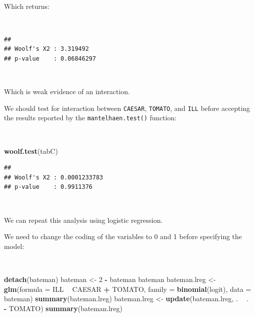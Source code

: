 \documentclass[12pt,a4paper]{book}
\newenvironment{Shaded}{\begin{snugshade}}{\end{snugshade}}
\newcommand{\DataTypeTok}[1]{\textcolor[rgb]{0.13,0.29,0.53}{#1}}
\newcommand{\DecValTok}[1]{\textcolor[rgb]{0.00,0.00,0.81}{#1}}
\newcommand{\KeywordTok}[1]{\textcolor[rgb]{0.13,0.29,0.53}{\textbf{#1}}}
\newcommand{\NormalTok}[1]{#1}
\newcommand{\OperatorTok}[1]{\textcolor[rgb]{0.81,0.36,0.00}{\textbf{#1}}}
\newcommand{\StringTok}[1]{\textcolor[rgb]{0.31,0.60,0.02}{#1}}
\theoremstyle{definition}
\theoremstyle{definition}
\theoremstyle{definition}
\theoremstyle{remark}
\begin{document}
~

Which returns:

~

\begin{verbatim}
## 
## Woolf's X2 : 3.319492 
## p-value    : 0.06846297
\end{verbatim}

~

Which is weak evidence of an interaction.

We should test for interaction between \texttt{CAESAR}, \texttt{TOMATO},
and \texttt{ILL} before accepting the results reported by the
\texttt{mantelhaen.test()} function:

~

\begin{Shaded}
\begin{Highlighting}[]
\KeywordTok{woolf.test}\NormalTok{(tabC)}
\end{Highlighting}
\end{Shaded}

\begin{verbatim}
## 
## Woolf's X2 : 0.0001233783 
## p-value    : 0.9911376
\end{verbatim}

~

We can repeat this analysis using logistic regression.

\newpage

We need to change the coding of the variables to 0 and 1 before
specifying the model:

~

\begin{Shaded}
\begin{Highlighting}[]
\KeywordTok{detach}\NormalTok{(bateman)}
\NormalTok{bateman <-}\StringTok{ }\DecValTok{2} \OperatorTok{-}\StringTok{ }\NormalTok{bateman}
\NormalTok{bateman}
\NormalTok{bateman.lreg <-}\StringTok{ }\KeywordTok{glm}\NormalTok{(}\DataTypeTok{formula =}\NormalTok{ ILL }\OperatorTok{~}\StringTok{ }\NormalTok{CAESAR }\OperatorTok{+}\StringTok{ }\NormalTok{TOMATO,}
                    \DataTypeTok{family =} \KeywordTok{binomial}\NormalTok{(logit), }\DataTypeTok{data =}\NormalTok{ bateman)}
\KeywordTok{summary}\NormalTok{(bateman.lreg)}
\NormalTok{bateman.lreg <-}\StringTok{ }\KeywordTok{update}\NormalTok{(bateman.lreg, . }\OperatorTok{~}\StringTok{ }\NormalTok{. }\OperatorTok{-}\StringTok{ }\NormalTok{TOMATO)}
\KeywordTok{summary}\NormalTok{(bateman.lreg)}
\end{Highlighting}
\end{Shaded}
\end{document}
